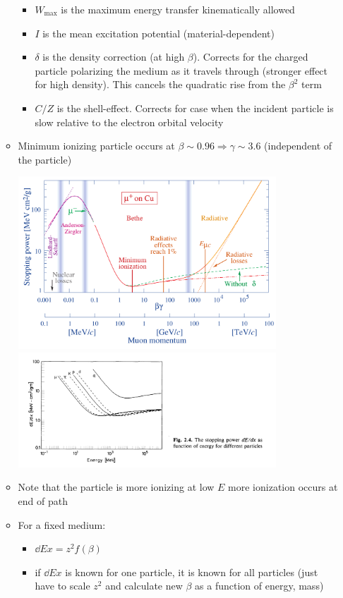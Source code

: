 \begin{itemize}
\begin{itemize}
\begin{itemize}
      \item $W_\text{max}$ is the maximum energy transfer kinematically allowed
      \item $I$ is the mean excitation potential (material-dependent)
      \item $\delta$ is the density correction (at high $\beta$). Corrects for the charged particle polarizing the medium as it travels through (stronger effect for high density). This cancels the quadratic rise from the $\beta^2$ term
      \item $C/Z$ is the shell-effect. Corrects for case when the incident particle is slow relative to the electron orbital velocity
    \end{itemize}
    \item Minimum ionizing particle occurs at $\beta \sim 0.96 \Rightarrow \gamma \sim 3.6$ (independent of the particle)
    \begin{center}
      \includegraphics[width=0.8\textwidth]{figs/dEdx_bbPDG.png}
      \includegraphics[width=0.8\textwidth]{figs/dEdx_bethebloch.png}
    \end{center}
    \item Note that the particle is more ionizing at low $E$ \thus more ionization occurs at end of path
    \item For a fixed medium:
    \begin{itemize}
      \item $\dd{E}{x} = z^2 f(\beta)$
      \item \thus if $\dd{E}{x}$ is known for one particle, it is known for all particles (just have to scale $z^2$ and calculate new $\beta$ as a function of energy, mass)
    \end{itemize}
  \end{itemize}
\end{itemize}

